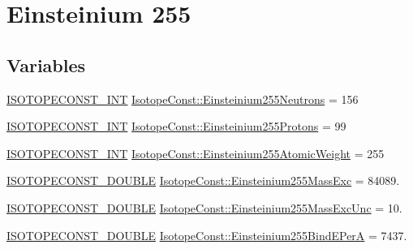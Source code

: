 \hypertarget{group___isotope_const-_einsteinium-_es255}{}\section{Einsteinium 255}
\label{group___isotope_const-_einsteinium-_es255}
\subsection*{Variables}
\begin{DoxyCompactItemize}
\item 
\mbox{\hyperlink{group___isotope_const-_macros_ga5f18360b3e99483a35c32d789e62621c}{I\+S\+O\+T\+O\+P\+E\+C\+O\+N\+S\+T\+\_\+\+I\+NT}} \mbox{\hyperlink{group___isotope_const-_einsteinium-_es255_ga72b37d13f809b98d76d4b37b315bdea6}{Isotope\+Const\+::\+Einsteinium255\+Neutrons}} = 156
\item 
\mbox{\hyperlink{group___isotope_const-_macros_ga5f18360b3e99483a35c32d789e62621c}{I\+S\+O\+T\+O\+P\+E\+C\+O\+N\+S\+T\+\_\+\+I\+NT}} \mbox{\hyperlink{group___isotope_const-_einsteinium-_es255_ga73981f1dadcc4b4f8aeb67a419fc09bc}{Isotope\+Const\+::\+Einsteinium255\+Protons}} = 99
\item 
\mbox{\hyperlink{group___isotope_const-_macros_ga5f18360b3e99483a35c32d789e62621c}{I\+S\+O\+T\+O\+P\+E\+C\+O\+N\+S\+T\+\_\+\+I\+NT}} \mbox{\hyperlink{group___isotope_const-_einsteinium-_es255_gae3d2dd3fcfcee4d1a1be22be552fbb28}{Isotope\+Const\+::\+Einsteinium255\+Atomic\+Weight}} = 255
\item 
\mbox{\hyperlink{group___isotope_const-_macros_ga8f45a7272ce02c0b4c65c44636ed719a}{I\+S\+O\+T\+O\+P\+E\+C\+O\+N\+S\+T\+\_\+\+D\+O\+U\+B\+LE}} \mbox{\hyperlink{group___isotope_const-_einsteinium-_es255_ga63846a0f3d4f53d035767019e020b3a4}{Isotope\+Const\+::\+Einsteinium255\+Mass\+Exc}} = 84089.
\item 
\mbox{\hyperlink{group___isotope_const-_macros_ga8f45a7272ce02c0b4c65c44636ed719a}{I\+S\+O\+T\+O\+P\+E\+C\+O\+N\+S\+T\+\_\+\+D\+O\+U\+B\+LE}} \mbox{\hyperlink{group___isotope_const-_einsteinium-_es255_ga13e171899c3490f5ff81665ff38e39f7}{Isotope\+Const\+::\+Einsteinium255\+Mass\+Exc\+Unc}} = 10.
\item 
\mbox{\hyperlink{group___isotope_const-_macros_ga8f45a7272ce02c0b4c65c44636ed719a}{I\+S\+O\+T\+O\+P\+E\+C\+O\+N\+S\+T\+\_\+\+D\+O\+U\+B\+LE}} \mbox{\hyperlink{group___isotope_const-_einsteinium-_es255_ga3cd2d1323e412a917e70e15236438156}{Isotope\+Const\+::\+Einsteinium255\+Bind\+E\+PerA}} = 7437.

\end{DoxyCompactItemize}
